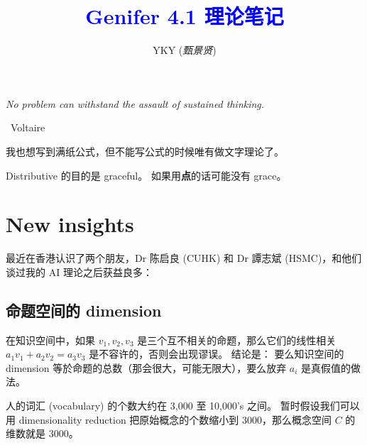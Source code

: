 \documentclass[12pt]{article}
\title{\textcolor{blue}{Genifer 4.1 理论笔记}}
\author{YKY (\textit{甄景贤})}
\newcommand{\tab}{\hspace*{1cm}}
\begin{document}
\tab\tab\tab \parbox{9cm}{\textit{No problem can withstand the assault of sustained thinking.}}
\begin{flushright}
\textemdash\, Voltaire \hspace{3cm}
\end{flushright}

\sffamily

{\let\newpage\relax\maketitle}

\maketitle
\setlength{\parindent}{0em}
\setlength{\parskip}{1.5ex plus0.5ex minus1.2ex}

我也想写到满纸公式，但不能写公式的时候唯有做文字理论了。

Distributive 的目的是 graceful。  如果用\textbf{点}的话可能没有 grace。



\section{New insights}

最近在香港认识了两个朋友，Dr 陈启良 (CUHK) 和 Dr 譚志斌 (HSMC)，和他们谈过我的 AI 理论之后获益良多：

\subsection{命题空间的 dimension}

在知识空间中，如果 $v_1, v_2, v_3$ 是三个互不相关的命题，那么它们的线性相关 $ a_1 v_1 + a_2 v_2 = a_3 v_3 $ 是不容许的，否则会出现谬误。 结论是： 要么知识空间的 dimension 等於命题的总数（那会很大，可能无限大），要么放弃 $a_i$ 是真假值的做法。

人的词汇 (vocabulary) 的个数大约在 3,000 至 10,000's 之间。  暂时假设我们可以用 dimensionality reduction 把原始概念的个数缩小到 3000，那么概念空间 $C$ 的维数就是 3000。
\end{document}
